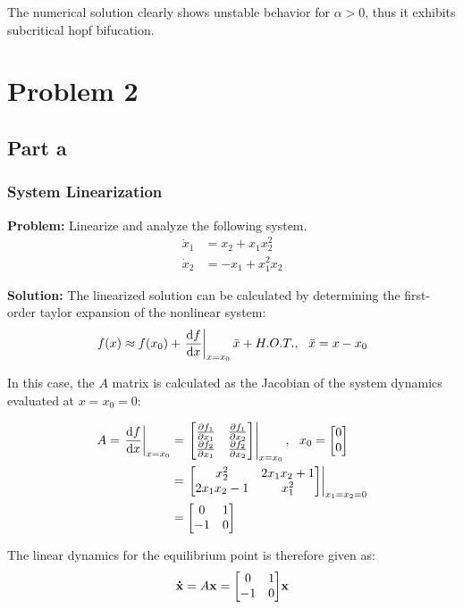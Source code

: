 \documentclass[letter]{article}
\begin{document}
The numerical solution clearly shows unstable behavior for $\alpha > 0$, thus it exhibits subcritical hopf bifucation.


\newpage
\section{Problem 2}

\subsection{Part a}

\subsubsection{System Linearization}
\textbf{Problem:}
Linearize and analyze the following system.
\begin{equation}
	\begin{aligned}
		\dot{x}_1 &= x_2 + x_1 x_2^2\\
		\dot{x}_2 &= -x_1 + x_1^2 x_2
	\end{aligned}
\end{equation}

\noindent
\textbf{Solution:}
The linearized solution can be calculated by determining the first-order taylor expansion of the nonlinear system:
\begin{equation}
	f(x) \approx f(x_0) + \eval{\dv{f}{x}}_{x=x_0} \bar{x} + H.O.T., \ \ \bar{x} = x - x_0
\end{equation}

In this case, the $A$ matrix is calculated as the Jacobian of the system dynamics evaluated at $x=x_0=0$:

\begin{align}
	A = \eval{\dv{f}{x}}_{x=x_0} 
	&= \eval{\mqty[\pdv{f_1}{x_1} & \pdv{f_1}{x_2}\\
				  \pdv{f_2}{x_1} & \pdv{f_2}{x_2}]}_{x=x_0}
  	, \ \ x_0 = \mqty[0\\0]\\
  	&= \eval{\mqty[x_2^2 & 2 x_1 x_2 + 1\\
  					2 x_1 x_2 -1 & x_1^2]}_{x_1 = x_2 = 0}\\
	&= \mqty[0 & 1\\ -1 & 0]
\end{align}

The linear dynamics for the equilibrium point is therefore given as:
\begin{equation}
	\vb{\dot{x}} = A \vb{x} = \mqty[0 & 1\\ -1 & 0] \vb{x}
\end{equation}
\end{document}
